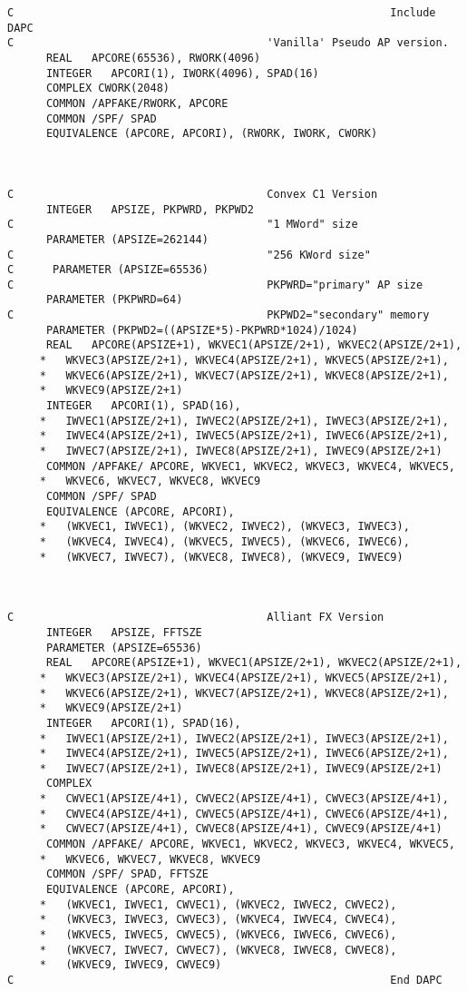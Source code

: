 \begin{verbatim}
C                                                          Include DAPC
C                                       'Vanilla' Pseudo AP version.
      REAL   APCORE(65536), RWORK(4096)
      INTEGER   APCORI(1), IWORK(4096), SPAD(16)
      COMPLEX CWORK(2048)
      COMMON /APFAKE/RWORK, APCORE
      COMMON /SPF/ SPAD
      EQUIVALENCE (APCORE, APCORI), (RWORK, IWORK, CWORK)



C                                       Convex C1 Version
      INTEGER   APSIZE, PKPWRD, PKPWD2
C                                       "1 MWord" size
      PARAMETER (APSIZE=262144)
C                                       "256 KWord size"
C      PARAMETER (APSIZE=65536)
C                                       PKPWRD="primary" AP size
      PARAMETER (PKPWRD=64)
C                                       PKPWD2="secondary" memory
      PARAMETER (PKPWD2=((APSIZE*5)-PKPWRD*1024)/1024)
      REAL   APCORE(APSIZE+1), WKVEC1(APSIZE/2+1), WKVEC2(APSIZE/2+1),
     *   WKVEC3(APSIZE/2+1), WKVEC4(APSIZE/2+1), WKVEC5(APSIZE/2+1),
     *   WKVEC6(APSIZE/2+1), WKVEC7(APSIZE/2+1), WKVEC8(APSIZE/2+1),
     *   WKVEC9(APSIZE/2+1)
      INTEGER   APCORI(1), SPAD(16),
     *   IWVEC1(APSIZE/2+1), IWVEC2(APSIZE/2+1), IWVEC3(APSIZE/2+1),
     *   IWVEC4(APSIZE/2+1), IWVEC5(APSIZE/2+1), IWVEC6(APSIZE/2+1),
     *   IWVEC7(APSIZE/2+1), IWVEC8(APSIZE/2+1), IWVEC9(APSIZE/2+1)
      COMMON /APFAKE/ APCORE, WKVEC1, WKVEC2, WKVEC3, WKVEC4, WKVEC5,
     *   WKVEC6, WKVEC7, WKVEC8, WKVEC9
      COMMON /SPF/ SPAD
      EQUIVALENCE (APCORE, APCORI),
     *   (WKVEC1, IWVEC1), (WKVEC2, IWVEC2), (WKVEC3, IWVEC3),
     *   (WKVEC4, IWVEC4), (WKVEC5, IWVEC5), (WKVEC6, IWVEC6),
     *   (WKVEC7, IWVEC7), (WKVEC8, IWVEC8), (WKVEC9, IWVEC9)



C                                       Alliant FX Version
      INTEGER   APSIZE, FFTSZE
      PARAMETER (APSIZE=65536)
      REAL   APCORE(APSIZE+1), WKVEC1(APSIZE/2+1), WKVEC2(APSIZE/2+1),
     *   WKVEC3(APSIZE/2+1), WKVEC4(APSIZE/2+1), WKVEC5(APSIZE/2+1),
     *   WKVEC6(APSIZE/2+1), WKVEC7(APSIZE/2+1), WKVEC8(APSIZE/2+1),
     *   WKVEC9(APSIZE/2+1)
      INTEGER   APCORI(1), SPAD(16),
     *   IWVEC1(APSIZE/2+1), IWVEC2(APSIZE/2+1), IWVEC3(APSIZE/2+1),
     *   IWVEC4(APSIZE/2+1), IWVEC5(APSIZE/2+1), IWVEC6(APSIZE/2+1),
     *   IWVEC7(APSIZE/2+1), IWVEC8(APSIZE/2+1), IWVEC9(APSIZE/2+1)
      COMPLEX
     *   CWVEC1(APSIZE/4+1), CWVEC2(APSIZE/4+1), CWVEC3(APSIZE/4+1),
     *   CWVEC4(APSIZE/4+1), CWVEC5(APSIZE/4+1), CWVEC6(APSIZE/4+1),
     *   CWVEC7(APSIZE/4+1), CWVEC8(APSIZE/4+1), CWVEC9(APSIZE/4+1)
      COMMON /APFAKE/ APCORE, WKVEC1, WKVEC2, WKVEC3, WKVEC4, WKVEC5,
     *   WKVEC6, WKVEC7, WKVEC8, WKVEC9
      COMMON /SPF/ SPAD, FFTSZE
      EQUIVALENCE (APCORE, APCORI),
     *   (WKVEC1, IWVEC1, CWVEC1), (WKVEC2, IWVEC2, CWVEC2),
     *   (WKVEC3, IWVEC3, CWVEC3), (WKVEC4, IWVEC4, CWVEC4),
     *   (WKVEC5, IWVEC5, CWVEC5), (WKVEC6, IWVEC6, CWVEC6),
     *   (WKVEC7, IWVEC7, CWVEC7), (WKVEC8, IWVEC8, CWVEC8),
     *   (WKVEC9, IWVEC9, CWVEC9)
C                                                          End DAPC

\end{verbatim}
